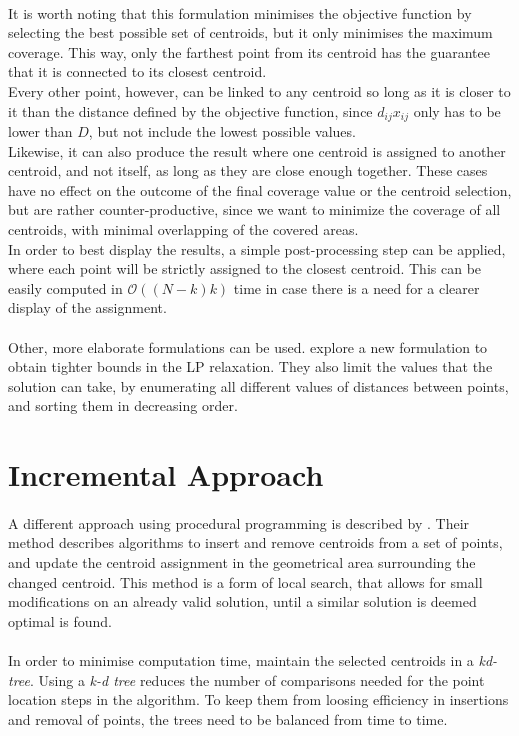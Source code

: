 \paragraph{}
It is worth noting that this formulation minimises the objective function by selecting the best possible set of centroids, but it only minimises the maximum coverage. This way, only the farthest point from its centroid has the guarantee that it is connected to its closest centroid.\\
Every other point, however, can be linked to any centroid so long as it is closer to it than the distance defined by the objective function, since $d_{ij}x_{ij}$ only has to be lower than $D$, but not include the lowest possible values.\\
Likewise, it can also produce the result where one centroid is assigned to another centroid, and not itself, as long as they are close enough together.
These cases have no effect on the outcome of the final coverage value or the centroid selection, but are rather counter-productive, since we want to minimize the coverage of all centroids, with minimal overlapping of the covered areas.\\
In order to best display the results, a simple post-processing step can be applied, where each point will be strictly assigned to the closest centroid. This can be easily computed in $\mathcal{O}((N-k)k)$ time in case there is a need for a clearer display of the assignment.

\paragraph{}
Other, more elaborate formulations can be used. \citet{linearprog} explore a new formulation to obtain tighter bounds in the LP relaxation. They also limit the values that the solution can take, by enumerating all different values of distances between points, and sorting them in decreasing order.

\section{Incremental Approach}
\paragraph{}
A different approach using procedural programming is described by \citet{incrementalcov}. Their method describes algorithms to insert and remove centroids from a set of points, and update the centroid assignment in the geometrical area surrounding the changed centroid. This method is a form of local search, that allows for small modifications on an already valid solution, until a similar solution is deemed optimal is found. 

\paragraph{}
In order to minimise computation time, \citet{incrementalcov} maintain the selected centroids in a \emph{kd-tree}. Using a \emph{k-d tree} reduces the number of comparisons needed for the point location steps in the algorithm. To keep them from loosing efficiency in insertions and removal of points, the trees need to be balanced from time to time.
